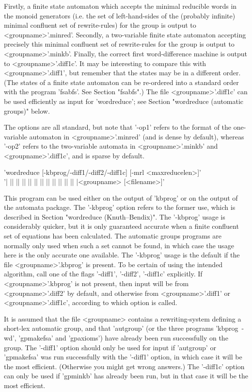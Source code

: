 Firstly, a finite state automaton which accepts the
minimal reducible words in the monoid generators (i.e. the set of
left-hand-sides  of the (probably infinite) minimal confluent set of
rewrite-rules) for the group is output to <groupname>'.minred'.
Secondly, a two-variable finite state automaton accepting precisely
this minimal confluent set of rewrite-rules
for the group is output to <groupname>'.minkb'.
Finally, the correct first word-difference machine is output to
<groupname>'.diff1c'. It may be interesting to compare this with
<groupname>'.diff1', but remember that the states may be in a different
order. (The states of a finite state automaton can be re-ordered into a
standard order with the program 'fsabfs'. See Section "fsabfs".)
The file <groupname>'.diff1c' can be used efficiently as input for
'wordreduce'; see Section "wordreduce (automatic groups)" below.

The options are all standard, but note that '-op1' refers to the format
of the one-variable automaton in <groupname>'.minred' (and is dense by
default), whereas '-op2' refers to the two-variable automata in
<groupname>'.minkb' and <groupname>'.diff1c', and is sparse by default.

'wordreduce  [-kbprog/-diff1/-diff2/-diff1c] [-mrl <maxreducelen>]'\\
'| || || || || || || || || || || || |<groupname> [<filename>]'

This program can be used either on the output of 'kbprog' or on the output
of the automata package. The '-kbprog' option refers to the former use,
which is described in Section "wordreduce (Knuth--Bendix)".
The '-kbprog' usage is considerably quicker, but it is only guaranteed
accurate when a finite confluent set of equations has been calculated. 
The automatic groups programs are normally only used when such a set
cannot be found, in which case the usage here is the only
accurate one available.
The '-kbprog' usage is the default if the file <groupname>'.kbprog' is present.
To be certain of using the intended algorithm, call one of the flags
'-diff1', '-diff2', '-diff1c' explicitly.
If <groupname>'.kbprog' is not present, then input will be from
<groupname>'.diff2' by default, and otherwise from <groupname>'.diff1'
or <groupname>'.diff1c', according to which option is called.

It is assumed that the file <groupname> contains a rewriting-system
defining a short-lex automatic group,
and that 'autgroup' (or the three programs 'kbprog\ -wd', 'gpmakefsa'
and 'gpaxioms') have already been run successfully on the group.
The '-diff1' option should only be used for input if  'autgroup' or
'gpmakefsa' was run successfully with the '-diff1' option, in which
case it will be the most efficient. (Otherwise you might get wrong answers.)
The  '-diff1c' option can only be used if 'gpminkb' has already been run,
but in that case it will be the most efficient.

